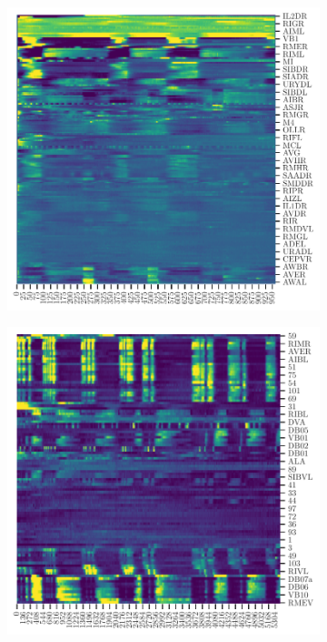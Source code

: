  
  \begin{figure}
 	\centering
 	\begin{subfigure}[b]{0.3\textwidth}
 		\centering
 		\includegraphics[width=\textwidth]{cluster_neuropal.pdf}
 		\caption{}
 		\label{fig:cluster_neuropal}
 	\end{subfigure}
 	\begin{subfigure}[b]{0.3\textwidth}
 		\centering
 		\includegraphics[width=\textwidth]{cluster_kaplan.pdf}

\end{subfigure}
\end{figure}

